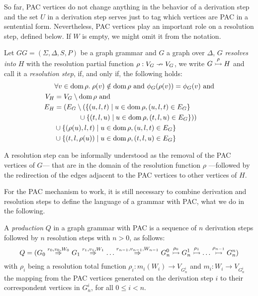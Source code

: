 So far, PAC vertices do not change anything in the behavior of a derivation step and the set $U$ in a derivation step serves just to tag which vertices are PAC in a sentential form. Nevertheless, PAC vertices play an important role on a resolution step, defined below. If $W$ is empty, we might omit it from the notation.

\begin{definition}
	\label{def:resolv}
	Let $GG = (\Sigma, \Delta, S, P)$ be a graph grammar and $G$ a graph over $\Delta$, $G$ \emph{resolves into} $H$ with the resolution partial function $\rho: V_G \nrightarrow V_G$, we write $G \overset{\rho}{\rightarrowtail} H$ and call it a \emph{resolution step}, if, and only if, the following holds:
	\begin{align*}
		& \forall v \in \operatorname{dom} \rho . \; \rho(v) \notin \operatorname{dom} \rho \text{ and } \phi_G(\rho(v)) = \phi_G(v) \text{ and}\\
		V_H & = V_G \setminus \operatorname{dom} \rho \text{ and}\\
		E_H & = (E_G \setminus (\{(u,l,t) \; | \; u \in \operatorname{dom} \rho, (u,l,t) \in E_G\} \\
			&\hspace{3.5em} \cup \{(t,l,u) \; | \; u \in \operatorname{dom} \rho, (t,l,u) \in E_G\}))\\
		    & \cup \{(\rho(u),l,t) \; | \; u \in \operatorname{dom} \rho, (u,l,t) \in E_G\} \\
		    & \cup \{(t,l,\rho(u)) \; | \; u \in \operatorname{dom} \rho, (t,l,u) \in E_G\}
	\end{align*}
\end{definition}

A resolution step can be informally understood as the removal of the PAC vertices of $G$--- that are in the domain of the resolution function $\rho$ ---followed by the redirection of the edges adjacent to the PAC vertices to other vertices of $H$.

For the PAC mechanism to work, it is still necessary to combine derivation and resolution steps to define the language of a grammar with PAC, what we do in the following.

\begin{definition}
	A \emph{production} $Q$ in a graph grammar with PAC is a sequence of $n$ derivation steps followed by $n$ resolution steps with $n > 0$, as follows:
	\begin{equation*}
		Q = (G_0 \derivpac{r_0}{v_0}{W_0}{} G_1 \derivpac{r_1}{v_1}{W_1}{} \dots \derivpac{r_{n-1}}{v_{n-1}}{W_{n-1}}{} G_n^0 \resolv{\rho_0} G_n^1 \resolv{\rho_1} \dots \resolv{\rho_{n-1}} G_n^n)
	\end{equation*}
	with $\rho_i$ being a resolution total function $\rho_i : m_i(W_i) \to V_{G_n^i}$ and $m_i : W_i \to V_{G_n^i}$ the mapping from the PAC vertices generated on the derivation step $i$ to their correspondent vertices in $G_n^i$, for all $0 \le i < n$.
\end{definition}

